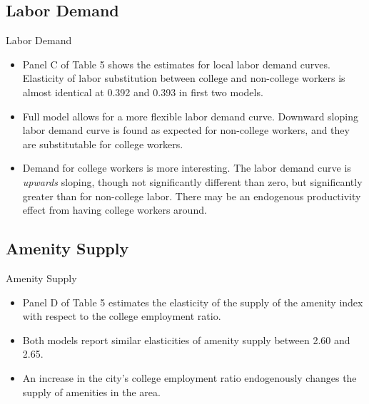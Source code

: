 \documentclass[aspectratio=169]{beamer}
\begin{document}

\subsection{Labor Demand}


\begin{frame}{Labor Demand}

\begin{itemize}
    \item<1-> Panel C of Table 5 shows the estimates for local labor demand curves.  Elasticity of labor substitution between college and non-college workers is almost identical at 0.392 and 0.393 in first two models.
    \item<2-> Full model allows for a more flexible labor demand curve.  Downward sloping labor demand curve is found as expected for non-college workers, and they are substitutable for college workers.
    \item<3-> Demand for college workers is more interesting.  The labor demand curve is \emph{upwards} sloping, though not significantly different than zero, but significantly greater than for non-college labor. There may be an endogenous productivity effect from having college workers around.
\end{itemize}
    
\end{frame}


\subsection{Amenity Supply}


\begin{frame}{Amenity Supply}

\begin{itemize}
    \item<1->  Panel D of Table 5 estimates the elasticity of the supply of the amenity index with respect to the college employment ratio.
    \item<2-> Both models report similar elasticities of amenity supply between 2.60 and 2.65.
    \item<3->  An increase in the city’s college employment ratio endogenously changes the supply of amenities in the area.
\end{itemize}
    
\end{frame}
\end{document}
